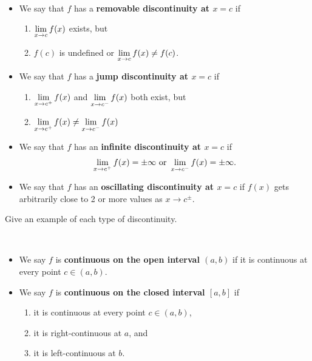\begin{definition}\,
\begin{itemize}
\item We say that $f$ has a \textbf{removable discontinuity at $x=c$} if
\begin{enumerate}
\item $\displaystyle\lim_{x\to c}f(x)$ exists, but
\item $f(c)$ is undefined or $\displaystyle\lim_{x\to c}f(x)\ne f(c)$.
\end{enumerate}
\item We say that $f$ has a \textbf{jump discontinuity at $x=c$} if
\begin{enumerate}
\item $\displaystyle\lim_{x\to c^+}f(x)$ and $\displaystyle\lim_{x\to c^-}f(x)$ both exist, but
\item $\displaystyle\lim_{x\to c^+}f(x)\ne\displaystyle\lim_{x\to c^-}f(x)$
\end{enumerate}
\item We say that $f$ has an \textbf{infinite discontinuity at $x=c$} if 
\begin{equation*}
\displaystyle\lim_{x\to c^+}f(x)=\pm\infty\text{ or }\displaystyle\lim_{x\to c^-}f(x)=\pm\infty.
\end{equation*}
\item We say that $f$ has an \textbf{oscillating discontinuity at $x=c$} if 
$f(x)$ gets arbitrarily close to 2 or more values as $x\to c^{\pm}$.
\end{itemize}
\end{definition}

\begin{example}
Give an example of each type of discontinuity.
\end{example}

\newpage

\begin{definition}\,
\begin{itemize}
\item We say $f$ is \textbf{continuous on the open interval $(a,b)$} if it is continuous at every point $c\in (a,b)$.
\item We say $f$ is \textbf{continuous on the closed interval $[a,b]$} if
\begin{enumerate}
\item it is continuous at every point $c\in (a,b)$,
\item it is right-continuous at $a$, and
\item it is left-continuous at $b$.
\end{enumerate}
\end{itemize}
\end{definition}

